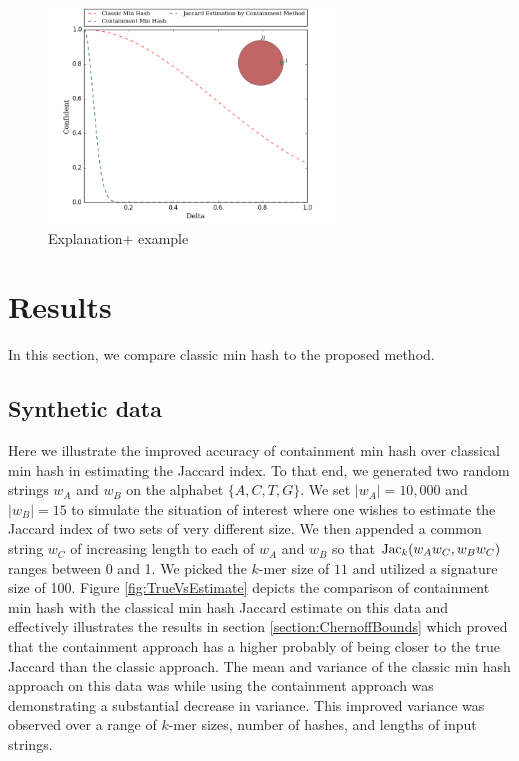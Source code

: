 \documentclass[11pt]{amsart}
\theoremstyle{remark}
\numberwithin{equation}{section}
\newcommand{\themethod}{containment min hash }
\DeclareMathOperator{\Jac}{{\rm Jac}}
\newcommand{\SyntheticDataClassic}{\protect }
\newcommand{\SyntheticDataContainment}{\protect }
\begin{document}
\begin{figure}[!h]
\begin{center}
\hspace{1ex}
\includegraphics[width=3.0in,trim={0 0 0 0in},clip]{Figs/deltaConfident-20090.png}
\end{center}
\caption{Explanation+ example }
\label{fig:DeltaK}%
\end{figure}


\section{Results}
In this section, we compare classic min hash to the proposed method.
\subsection{Synthetic data}
\label{section:SyntheticData}
Here we illustrate the improved accuracy of \themethod over classical min hash in estimating the Jaccard index. To that end, we generated two random strings $w_A$ and $w_B$ on the alphabet $\{A,C,T,G\}$. We set $|w_A|= 10,000$ and $|w_B| = 15$ to simulate the situation of interest where one wishes to estimate the Jaccard index of two sets of very different size. We then appended a common string $w_C$ of increasing length to each of $w_A$ and $w_B$ so that $\Jac_k(w_Aw_C, w_Bw_C)$ ranges between 0 and 1. We picked the $k$-mer size of $11$ and utilized a signature size of 100. Figure \ref{fig:TrueVsEstimate} depicts the comparison of \themethod with the classical min hash Jaccard estimate on this data and effectively illustrates the results in section \ref{section:ChernoffBounds} which proved that the containment approach has a higher probably of being closer to the true Jaccard than the classic approach. The mean and variance of the classic min hash approach on this data was \SyntheticDataClassic while using the containment approach was \SyntheticDataContainment demonstrating a substantial decrease in variance. This improved variance was observed over a range of $k$-mer sizes, number of hashes, and lengths of input strings.
\end{document}

